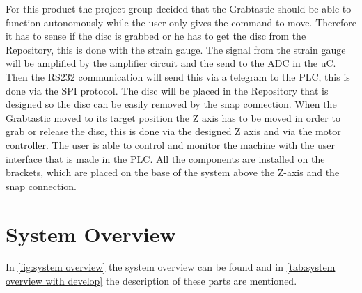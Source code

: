 \documentclass[a4paper,12pt]{scrreprt}
\begin{document}
For this product the project group decided that the Grabtastic should be able to function autonomously while the user only gives the command to move. Therefore it has to sense if the disc is grabbed or he has to get the disc from the \acs{Repository}, this is done with the strain gauge. The signal from the strain gauge will be amplified by the amplifier circuit and the send to the \acs{ADC} in the \acs{uC}. Then the \acs{RS232} communication will send this via a telegram to the \acs{PLC}, this is done via the \acs{SPI} protocol. The disc will be placed in the \acs{Repository} that is designed so the disc can be easily removed by the snap connection. When the Grabtastic moved to its target position the Z axis has to be moved in order to grab or release the disc, this is done via the designed Z axis and via the motor controller. The user is able to control and monitor the machine with the user interface that is made in the \acs{PLC}. All the components are installed on the brackets, which are placed on the base of the system above the Z-axis and the snap connection.

\section{System Overview}

In \autoref{fig:system overview} the system overview can be found and in \autoref{tab:system overview with develop} the description of these parts are mentioned.
\end{document}
